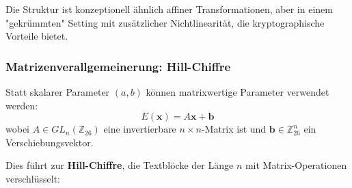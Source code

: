 ﻿\documentclass[12pt,a4paper]{article}
\begin{document}
	Die Struktur ist konzeptionell ähnlich affiner Transformationen, aber in einem "gekrümmten" Setting mit zusätzlicher Nichtlinearität, die kryptographische Vorteile bietet.
	
	\subsubsection{Matrizenverallgemeinerung: Hill-Chiffre}
	
	Statt skalarer Parameter $(a, b)$ können matrixwertige Parameter verwendet werden:
	\begin{equation}
		E(\mathbf{x}) = A\mathbf{x} + \mathbf{b}
	\end{equation}
	wobei $A \in GL_n(\mathbb{Z}_{26})$ eine invertierbare $n \times n$-Matrix ist und $\mathbf{b} \in \mathbb{Z}_{26}^n$ ein Verschiebungsvektor.
	
	Dies führt zur \textbf{Hill-Chiffre}, die Textblöcke der Länge $n$ mit Matrix-Operationen verschlüsselt:
	
\end{document}
